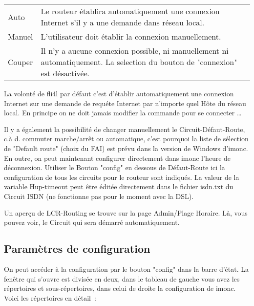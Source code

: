   \begin{tabular}{lp{9cm}}
    Auto    & Le routeur établira automatiquement une connexion
              Internet s'il y a une demande dans réseau local.\\
    Manuel  & L'utilisateur doit établir la connexion manuellement.\\
    Couper  & Il n'y a aucune connexion possible, ni manuellement ni
              automatiquement. La selection du bouton de "connexion" est
              désactivée.\\
  \end{tabular}

  \noindent La volonté de fli4l par défaut c'est d'établir automatiquement une
  connexion Internet sur une demande de requéte Internet par n'importe quel
  Hôte du réseau local. En principe on ne doit jamais modifier la commande pour
  se connecter \ldots

  Il y a également la possibilité de changer manuellement le Circuit-Défaut-Route,
  c.à d. commuter marche/arrêt ou automatique, c'est pourquoi la liste de sélection
  de "Default route" (choix du FAI) est prévu dans la version de Windows d'imonc.
  En outre, on peut maintenant configurer directement dans imonc l'heure de déconnexion.
  Utiliser le Bouton "config" en dessous de Défaut-Route ici la configuration de
  tous les circuits pour le routeur sont indiqués. La valeur de la variable
  Hup-timeout peut être éditée directement dans le fichier isdn.txt du Circuit ISDN
  (ne fonctionne pas pour le moment avec la DSL).

  Un aperçu de LCR-Routing se trouve sur la page Admin/Plage Horaire. Là,
  vous pouvez voir, le Circuit qui sera démarré automatiquement.

  \subsection{Paramètres de configuration}

  On peut accéder à la configuration par le bouton "config" dans la barre d'état.
  La fenêtre qui s'ouvre est divisée en deux, dans le tableau de gauche vous
  avez les répertoires et sous-répertoires, dans celui de droite la configuration
  de imonc. Voici les répertoires en détail~:

